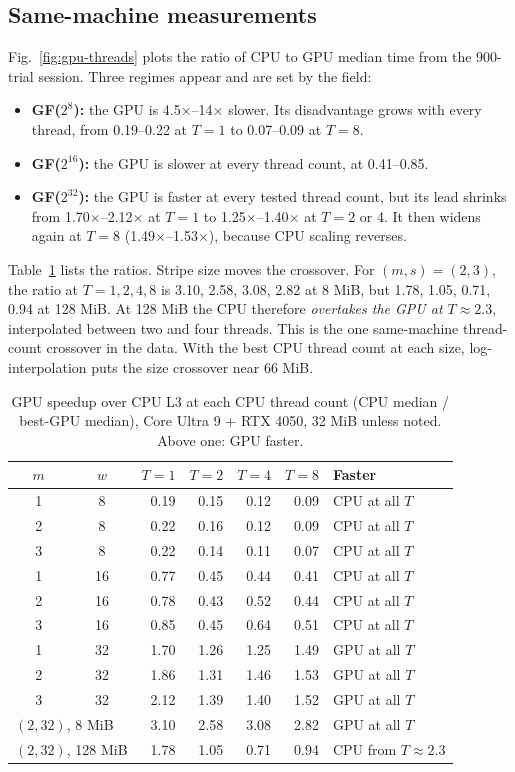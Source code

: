 \documentclass[conference]{IEEEtran}
\begin{document}
\subsection{Same-machine measurements}
Fig.~\ref{fig:gpu-threads} plots the ratio of CPU to GPU median time from the 900-trial session. Three regimes appear and are set by the field:
\begin{itemize}
\item \textbf{GF($2^8$):} the GPU is 4.5$\times$--14$\times$ slower. Its disadvantage grows with every thread, from 0.19--0.22 at $T=1$ to 0.07--0.09 at $T=8$.
\item \textbf{GF($2^{16}$):} the GPU is slower at every thread count, at 0.41--0.85.
\item \textbf{GF($2^{32}$):} the GPU is faster at every tested thread count, but its lead shrinks from 1.70$\times$--2.12$\times$ at $T=1$ to 1.25$\times$--1.40$\times$ at $T=2$ or 4. It then widens again at $T=8$ (1.49$\times$--1.53$\times$), because CPU scaling reverses.
\end{itemize}
Table~\ref{tab:gpu-ratio} lists the ratios. Stripe size moves the crossover. For $(m,s)=(2,3)$, the ratio at $T=1,2,4,8$ is 3.10, 2.58, 3.08, 2.82 at 8 MiB, but 1.78, 1.05, 0.71, 0.94 at 128 MiB. At 128 MiB the CPU therefore \emph{overtakes the GPU at $T\approx2.3$}, interpolated between two and four threads. This is the one same-machine thread-count crossover in the data. With the best CPU thread count at each size, log-interpolation puts the size crossover near 66 MiB.

\begin{table}[t]
\caption{GPU speedup over CPU L3 at each CPU thread count (CPU median / best-GPU median), Core Ultra 9 + RTX 4050, 32 MiB unless noted. Above one: GPU faster.}
\label{tab:gpu-ratio}
\centering
\footnotesize
\setlength{\tabcolsep}{4pt}
\begin{tabular}{cc rrrr l}
\hline
$m$ & $w$ & $T{=}1$ & $T{=}2$ & $T{=}4$ & $T{=}8$ & Faster\\
\hline
1&8&0.19&0.15&0.12&0.09&CPU at all $T$\\
2&8&0.22&0.16&0.12&0.09&CPU at all $T$\\
3&8&0.22&0.14&0.11&0.07&CPU at all $T$\\
1&16&0.77&0.45&0.44&0.41&CPU at all $T$\\
2&16&0.78&0.43&0.52&0.44&CPU at all $T$\\
3&16&0.85&0.45&0.64&0.51&CPU at all $T$\\
1&32&1.70&1.26&1.25&1.49&GPU at all $T$\\
2&32&1.86&1.31&1.46&1.53&GPU at all $T$\\
3&32&2.12&1.39&1.40&1.52&GPU at all $T$\\
\hline
\multicolumn{2}{l}{$(2,32)$, 8 MiB}&3.10&2.58&3.08&2.82&GPU at all $T$\\
\multicolumn{2}{l}{$(2,32)$, 128 MiB}&1.78&1.05&0.71&0.94&CPU from $T{\approx}2.3$\\
\hline
\end{tabular}
\end{table}
\end{document}
